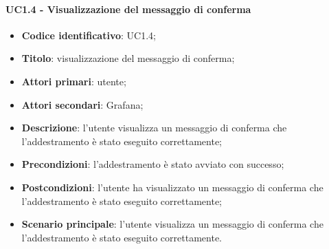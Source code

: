 \paragraph{UC1.4 - Visualizzazione del messaggio di conferma}
\begin{itemize}
	\item \textbf{Codice identificativo}: UC1.4;
	\item \textbf{Titolo}: visualizzazione del messaggio di conferma;
	\item \textbf{Attori primari}: utente;
	\item \textbf{Attori secondari}: Grafana\glo;
	\item \textbf{Descrizione}: l'utente visualizza un messaggio di conferma che l'addestramento è stato eseguito correttamente;
	\item \textbf{Precondizioni}: l'addestramento è stato avviato con successo;
	\item \textbf{Postcondizioni}: l'utente ha visualizzato un messaggio di conferma che l'addestramento è stato eseguito correttamente;
	\item \textbf{Scenario principale}: l'utente visualizza un messaggio di conferma che l'addestramento è stato eseguito correttamente.
\end{itemize}
